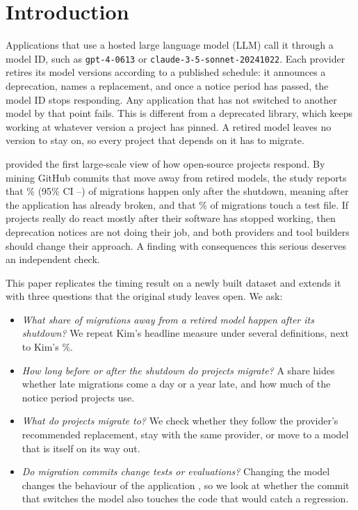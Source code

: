 \section{Introduction}\label{sec:intro}

Applications that use a hosted large language model (LLM) call it through a model ID, such as \texttt{gpt-4-0613} or \texttt{claude-3-5-sonnet-20241022}. Each provider retires its model versions according to a published schedule: it announces a deprecation, names a replacement, and once a notice period has passed, the model ID stops responding. Any application that has not switched to another model by that point fails. This is different from a deprecated library, which keeps working at whatever version a project has pinned. A retired model leaves no version to stay on, so every project that depends on it has to migrate.

\citet{kim2026retires} provided the first large-scale view of how open-source projects respond. By mining GitHub commits that move away from retired models, the study reports that \KimAfterShutdown\% (95\% CI \KimAfterShutdownLow--\KimAfterShutdownHigh) of migrations happen only after the shutdown, meaning after the application has already broken, and that \KimTouchTest\% of migrations touch a test file. If projects really do react mostly after their software has stopped working, then deprecation notices are not doing their job, and both providers and tool builders should change their approach. A finding with consequences this serious deserves an independent check.

This paper replicates the timing result on a newly built dataset and extends it with three questions that the original study leaves open. We ask:

\begin{itemize}
\item {} \emph{What share of migrations away from a retired model happen after its shutdown?} We repeat Kim's headline measure under several definitions, next to Kim's \KimAfterShutdown\%.
\item {} \emph{How long before or after the shutdown do projects migrate?} A share hides whether late migrations come a day or a year late, and how much of the notice period projects use.
\item {} \emph{What do projects migrate to?} We check whether they follow the provider's recommended replacement, stay with the same provider, or move to a model that is itself on its way out.
\item {} \emph{Do migration commits change tests or evaluations?} Changing the model changes the behaviour of the application \citep{chen2024chatgpt,ma2024prompt}, so we look at whether the commit that switches the model also touches the code that would catch a regression.
\end{itemize}

